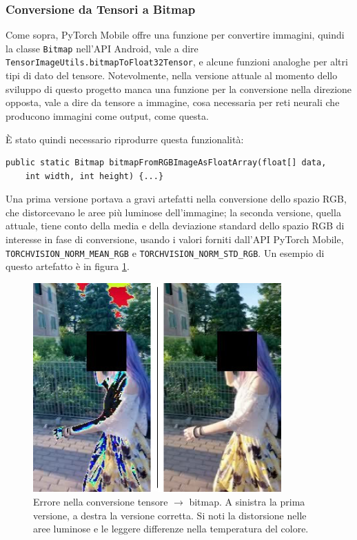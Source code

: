 \subsubsection*{Conversione da Tensori a Bitmap}

Come sopra, PyTorch Mobile offre una funzione per convertire immagini, quindi la classe
\texttt{Bitmap} nell'API Android, vale a dire \texttt{TensorImageUtils.bitmapToFloat32Tensor},
e alcune funzioni analoghe per altri tipi di dato del tensore. Notevolmente, nella versione 
attuale al momento dello sviluppo di questo progetto manca una funzione per la conversione
nella direzione opposta, vale a dire da tensore a immagine, cosa necessaria per reti neurali
che producono immagini come output, come questa.

È stato quindi necessario riprodurre questa funzionalità:

\begin{lstlisting}
public static Bitmap bitmapFromRGBImageAsFloatArray(float[] data, 
    int width, int height) {...}
\end{lstlisting}

Una prima versione portava a gravi artefatti nella conversione dello spazio RGB, che 
distorcevano le aree più luminose dell'immagine; la seconda versione, quella attuale, 
tiene conto della media e della deviazione standard dello spazio RGB di interesse in fase di
conversione, usando i valori forniti dall'API PyTorch Mobile, 
\texttt{TORCHVISION\_NORM\_MEAN\_RGB} e \texttt{TORCHVISION\_NORM\_STD\_RGB}. Un esempio di 
questo artefatto è in figura \ref{fig:img_conversion_error}.

\begin{figure}[!bh]
    \centering
    \includegraphics[width=0.85\textwidth]{img/conversione_img_errore.jpg}
    \caption{Errore nella conversione tensore $\rightarrow$ bitmap. A sinistra la prima versione, 
    a destra la versione corretta. Si noti la distorsione nelle aree luminose e le leggere
    differenze nella temperatura del colore.}
    \label{fig:img_conversion_error}
\end{figure}


